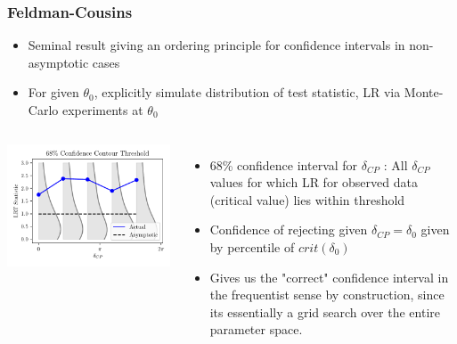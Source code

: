 \documentclass[9pt, aspectratio=169]{beamer}
\begin{document}
\begin{frame}
  \frametitle{Feldman-Cousins}
  \begin{itemize}
    \item Seminal result giving an ordering principle for confidence intervals in non-asymptotic cases
    \item For given $\theta_{0}$, explicitly simulate distribution of test statistic, LR via Monte-Carlo experiments at $\theta_{0}$
  \end{itemize}
  \begin{columns}
  \includegraphics[scale=0.7]{figures_final/threshold.pdf}
  \begin{itemize}
    \item 68\% confidence interval for $\delta_{CP}$ : All $\delta_{CP}$ values for which LR for observed data (critical value) lies within threshold
    \item Confidence of rejecting given $\delta_{CP} = \delta_{0}$ given by percentile of $crit(\delta_{0})$
    \item Gives us the "correct" confidence interval in the frequentist sense by construction, since its essentially a grid search over the entire parameter space.
  \end{itemize}
  \end{columns}
\end{frame}
\end{document}
